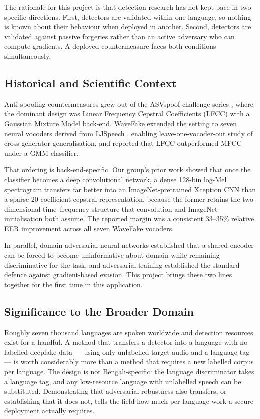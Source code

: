 \documentclass[conference]{IEEEtran}
\begin{document}
The rationale for this project is that detection research has not kept pace in
two specific directions. First, detectors are validated within one language,
so nothing is known about their behaviour when deployed in another. Second,
detectors are validated against passive forgeries rather than an active
adversary who can compute gradients. A deployed countermeasure faces both
conditions simultaneously.

\subsection{Historical and Scientific Context}
Anti-spoofing countermeasures grew out of the ASVspoof challenge series
\cite{todisco2019asvspoof}, where the dominant design was Linear Frequency
Cepstral Coefficients (LFCC) with a Gaussian Mixture Model back-end. WaveFake
\cite{frank2021wavefake} extended the setting to seven neural vocoders derived
from LJSpeech \cite{ito2017ljspeech}, enabling leave-one-vocoder-out study of
cross-generator generalisation, and reported that LFCC outperformed MFCC under
a GMM classifier.

That ordering is back-end-specific. Our group's prior work
\cite{ahmed2026melspec} showed that once the classifier becomes a deep
convolutional network, a dense 128-bin log-Mel spectrogram transfers far
better into an ImageNet-pretrained Xception CNN \cite{chollet2017xception}
than a sparse 20-coefficient cepstral representation, because the former
retains the two-dimensional time--frequency structure that convolution and
ImageNet initialisation both assume. The reported margin was a consistent
33--35\% relative EER improvement across all seven WaveFake vocoders.

In parallel, domain-adversarial neural networks \cite{ganin2016dann}
established that a shared encoder can be forced to become uninformative about
domain while remaining discriminative for the task, and adversarial training
\cite{goodfellow2015fgsm,madry2018pgd} established the standard defence
against gradient-based evasion. This project brings these two lines together
for the first time in this application.

\subsection{Significance to the Broader Domain}
Roughly seven thousand languages are spoken worldwide and detection resources
exist for a handful. A method that transfers a detector into a language with
no labelled deepfake data --- using only unlabelled target audio and a
language tag --- is worth considerably more than a method that requires a new
labelled corpus per language. The design is not Bengali-specific: the language
discriminator takes a language tag, and any low-resource language with
unlabelled speech can be substituted. Demonstrating that adversarial
robustness also transfers, or establishing that it does not, tells the field
how much per-language work a secure deployment actually requires.
\end{document}
